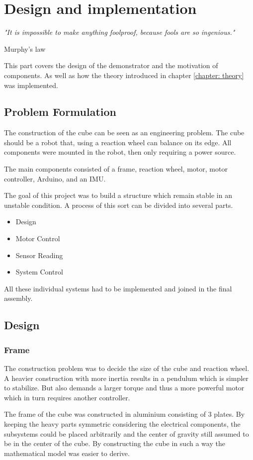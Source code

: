 \documentclass[a4paper,11pt]{kth-mag}
\begin{document}
 

 
\chapter{Design and implementation} \label{chapter: demonstrator}
\epigraph{\textit{"It is impossible to make anything foolproof, because fools are so ingenious."}}{Murphy's law}


This part covers the design of the demonstrator and the motivation of components. As well as how the theory introduced in chapter \ref{chapter: theory} was implemented.

\section{Problem Formulation}
The construction of the cube can be seen as an engineering problem. The cube should be a robot that,
using a reaction wheel can balance on its edge. All components were mounted in the robot, then only requiring a power source. 

The main components consisted of a frame, reaction wheel, motor, motor controller, Arduino, and an IMU.


The goal of this project was to build a structure which remain stable in an unstable condition. A process of this sort can be divided into several parts. 
\begin{itemize}
\item Design
\item Motor Control
\item Sensor Reading
\item System Control
\end{itemize}
All these individual systems had to be implemented and joined in the final assembly.

\section{Design}

\subsection{Frame}
The construction problem was to decide the size of the cube and reaction wheel. A heavier construction with more inertia results in a pendulum which is simpler to stabilize. But also demands a larger torque and thus a more powerful motor which in turn requires another controller.

The frame of the cube was constructed in aluminium consisting of 3 plates. By keeping the heavy parts symmetric considering the electrical components, the subsystems could be placed arbitrarily and the center of gravity still assumed to be in the center of the cube. By constructing the cube in such a way the mathematical model was easier to derive.
\end{document}
